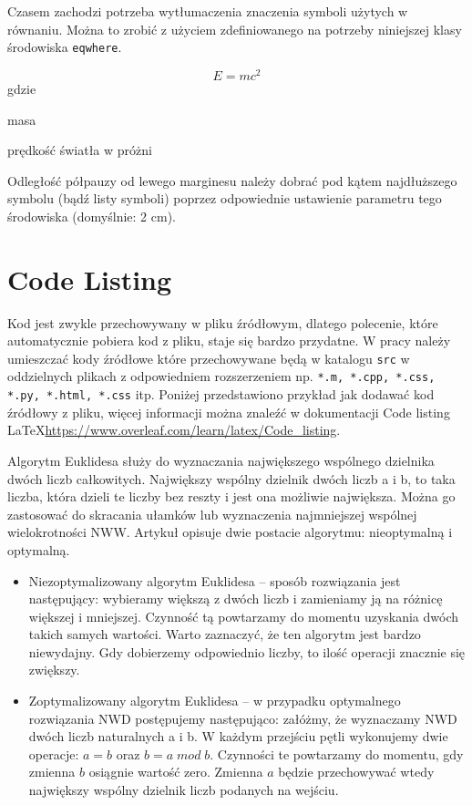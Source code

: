 Czasem zachodzi potrzeba wytłumaczenia znaczenia symboli użytych w równaniu. Można to zrobić z użyciem zdefiniowanego na potrzeby niniejszej klasy środowiska \texttt{eqwhere}.

\begin{equation}
    E = mc^2
\end{equation}
gdzie
\begin{eqwhere}[2cm]
    \item[$m$] masa
    \item[$c$] prędkość światła w próżni
\end{eqwhere}

Odległość półpauzy od lewego marginesu należy dobrać pod kątem najdłuższego symbolu (bądź listy symboli) poprzez odpowiednie ustawienie parametru tego środowiska (domyślnie: 2 cm).

\section{Code Listing}

Kod jest zwykle przechowywany w pliku źródłowym, dlatego polecenie, które automatycznie pobiera kod z pliku, staje się bardzo przydatne. W pracy należy umieszczać kody źródłowe które przechowywane będą w katalogu \texttt{src} w oddzielnych plikach z odpowiedniem rozszerzeniem np. \texttt{*.m, *.cpp, *.css, *.py, *.html, *.css} itp. Poniżej przedstawiono przykład jak dodawać kod źródłowy z pliku, więcej informacji można znaleźć w dokumentacji Code listing \LaTeX  \url{https://www.overleaf.com/learn/latex/Code_listing}.

Algorytm Euklidesa służy do wyznaczania największego wspólnego dzielnika dwóch liczb całkowitych. Największy wspólny dzielnik dwóch liczb a i  b, to taka liczba, która dzieli te liczby bez reszty i jest ona możliwie największa. Można go zastosować do skracania ułamków lub wyznaczenia najmniejszej wspólnej wielokrotności NWW. Artykuł opisuje dwie postacie algorytmu: nieoptymalną i optymalną.

\begin{itemize}
    \item Niezoptymalizowany algorytm Euklidesa -- sposób rozwiązania jest następujący: wybieramy większą z dwóch liczb i zamieniamy ją na różnicę większej i mniejszej. Czynność tą powtarzamy do momentu uzyskania dwóch takich samych wartości. Warto zaznaczyć, że ten algorytm jest bardzo niewydajny. Gdy dobierzemy odpowiednio liczby, to ilość operacji znacznie się zwiększy.
    \item Zoptymalizowany algorytm Euklidesa -- w przypadku optymalnego rozwiązania NWD postępujemy następująco: załóżmy, że wyznaczamy NWD dwóch liczb naturalnych a i b. W każdym przejściu pętli wykonujemy dwie operacje: $a = b$ oraz $b = a \; mod \; b$. Czynności te powtarzamy do momentu, gdy zmienna $b$ osiągnie wartość zero. Zmienna $a$ będzie przechowywać wtedy największy wspólny dzielnik liczb podanych na wejściu.
\end{itemize}

